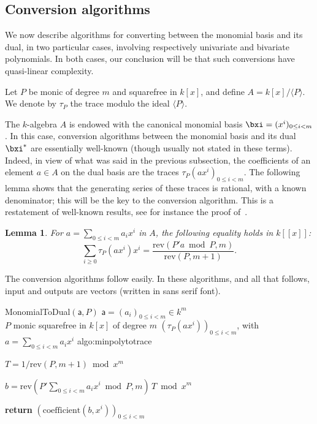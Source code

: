 \documentclass{sig-alternate}
\def\va {\ensuremath{\mathsf{a}}}
\def\coeff {\ensuremath{\mathrm{coefficient}}}
\def\rev {\ensuremath{\mathrm{rev}}}
\newcounter{algo}
\newenvironment{algorithm_noendline}[4]{\small\begin{center}\begin{minipage}{0.48\textwidth}
      \refstepcounter{algo}
      \label{#4}
      \sf
      \rule{\textwidth}{0.2pt}\\
      \makebox[\textwidth][c]{Algorithm~\arabic{algo}:~\textbf{#1}}\\
      \rule[0.5\baselineskip]{\textwidth}{0.2pt}\\

      \vspace{-12pt}

      \parbox{\textwidth}{\textbf{Input} #2}
      \parbox{\textwidth}{\textbf{Output} #3}

\vspace{-7pt}

      \begin{enumerate*}}{\end{enumerate*}
      \vspace{-11pt}
\end{minipage}\end{center}
}
\newcommand{\ang}[1]{\langle#1\rangle}
\newtheorem{Lemma}{Lemma}
\begin{document}

\subsection{Conversion algorithms} \label{ssec:conversions}
\label{sec:trace-formulas}

We now describe algorithms for converting between the monomial basis and its
dual, in two particular cases, involving respectively univariate
and bivariate polynomials. In both cases, our conclusion will be that
such conversions have quasi-linear complexity.

\smallskip{} 
Let $P$ be monic of degree $m$ and squarefree in $k[x]$, and define
$A=k[x]/\ang{P}$. We denote by $\tau_P$ the trace modulo the ideal $\ang{P}$.

The $k$-algebra $A$ is endowed with the canonical monomial basis
$\bxi=(x^i)_{0 \le i < m}$.  In this case, conversion algorithms
between the monomial basis and its dual $\bxi^\ast$ are essentially
well-known (though usually not stated in these terms). Indeed, in view
of what was said in the previous subsection, the coefficients of an
element $a \in A$ on the dual basis are the traces $\tau_P(ax^i)_{0
  \le i < m}$.  The following lemma shows that the generating series
of these traces is rational, with a known denominator; this will be
the key to the conversion algorithm. This is a restatement of
well-known results, see for instance the proof
of~\cite[Theorem~3.1]{rouiller99}.

\begin{Lemma}\label{lemma:trace:1}
  For $a=\sum_{0 \le i < m} a_i x^i$ in $A$, the following equality
  holds in $k[[x]]$:
  $$\sum_{i \ge 0} \tau_P(a x^i) x^i = \frac{\rev( P' a \bmod P,m)}{\rev(P,m+1)}.$$
\end{Lemma}

The conversion algorithms follow easily. In these algorithms, and all
that follows, input and outputs are vectors (written in {\sf sans
  serif} font).

\begin{algorithm_noendline}
{MonomialToDual$(\va,P)$}
{$\va=(a_i)_{0 \le i < m} \in k^m$ \\  $P$ monic squarefree in $k[x]$ of degree $m$}
{$(\tau_P(a x^i))_{0 \le i < m}$, with $a=\sum_{0 \le i < m} a_i x^i$}
{algo:minpolytotrace}
\item $T = 1/\rev(P, m+1) \bmod x^m$
\item $b = \rev(P' \sum_{0 \le i < m} a_i x^i \bmod P, m)\, T \bmod x^m$
\item {\bf return} $(\coeff(b,x^i))_{0 \le i < m}$
\end{algorithm_noendline}
\end{document}
